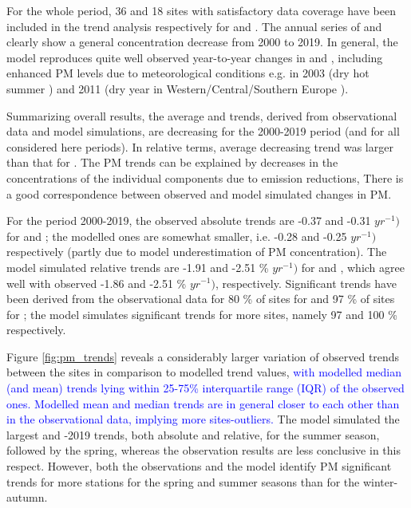 For the whole period, 36 and 18 sites with satisfactory data coverage have been included in the trend analysis respectively for \PM[10] and \PM[2.5]. The annual series of \PM[10] and \PM[2.5] clearly show a general concentration decrease from 2000 to 2019. In general, the model reproduces quite well observed year-to-year changes in \PM[10] and \PM[2.5], including enhanced PM levels due to meteorological conditions e.g. in 2003 (dry hot summer \citep{EMEP:PM2005}) and 2011 (dry year in Western/Central/Southern Europe \citep{EMEP:PM2013}).

Summarizing overall results, the average \PM[10] and \PM[2.5] trends, derived from observational data and model simulations, are decreasing for the 2000-2019 period (and for all considered here periods). In relative terms, \PM[2.5] average decreasing trend was larger than that for \PM[10]. The PM trends can be explained by decreases in the concentrations of the individual components due to emission reductions, There is a good correspondence between observed and model simulated changes in PM. %

For the period 2000-2019, the observed absolute trends are -0.37 and -0.31 \ug $yr^{-1})$ for \PM[10] and \PM[2.5]; the modelled ones are somewhat smaller, i.e. -0.28 and -0.25 \ug $yr^{-1})$ respectively (partly due to model underestimation of PM concentration). The model simulated relative trends are -1.91 and -2.51 \% $yr^{-1})$ for \PM[10] and \PM[2.5], which agree well with observed -1.86 and -2.51 \% $yr^{-1})$, respectively. Significant trends have been derived from the observational data for 80 \% of sites for \PM[10] and 97 \% of sites for \PM[2.5]; the model simulates significant trends for more sites, namely 97 and 100 \% respectively.  

Figure \ref{fig:pm_trends} reveals a considerably larger variation of observed trends between the sites in comparison to modelled trend values, \textcolor{blue}{with modelled median (and mean) trends lying within 25-75\% interquartile range (IQR) of the observed ones. Modelled mean and median trends are in general closer to each other than in the observational data, implying more sites-outliers.} The model simulated the largest \PM[10] and -2019 trends, both absolute and relative,  for the summer season, followed by the spring, whereas the observation results are less conclusive in this respect. However, both the observations and the model identify PM significant trends for more stations for the spring and summer seasons than for the winter-autumn. 

